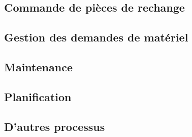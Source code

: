 \documentclass[a4paper]{article}
\begin{document}
\maketitle

\begin{abstract}
Ce document regroupe les annotations effectuées sur les différents MCT
employés au sein de GSTP. Pour inclure ce travail au livrable final,
copier/coller le code \LaTeX suivant.\\
NB : le paragraphe "Commande de pièces de rechange" n'est pas mis en forme.
Il faut se plaindre auprès de Victor .
\end{abstract}

\subsection{Commande de pièces de rechange}

\subsection{Gestion des demandes de matériel}

\subsection{Maintenance}

\subsection{Planification}

\subsection{D'autres processus}
\end{document}

